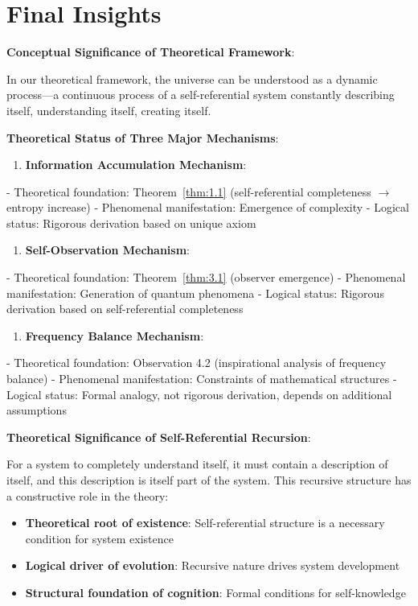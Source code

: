 \section{Final Insights}
\label{sec:ch06_conclusion:final-insights}

\textbf{Conceptual Significance of Theoretical Framework}:

In our theoretical framework, the universe can be understood as a dynamic process---a continuous process of a self-referential system constantly describing itself, understanding itself, creating itself.

\textbf{Theoretical Status of Three Major Mechanisms}:

\begin{enumerate}
\item \textbf{Information Accumulation Mechanism}:
\end{enumerate}
   - Theoretical foundation: Theorem~\ref{thm:1.1} (self-referential completeness $\rightarrow$ entropy increase)
   - Phenomenal manifestation: Emergence of complexity
   - Logical status: Rigorous derivation based on unique axiom

\begin{enumerate}
\item \textbf{Self-Observation Mechanism}:
\end{enumerate}
   - Theoretical foundation: Theorem~\ref{thm:3.1} (observer emergence)
   - Phenomenal manifestation: Generation of quantum phenomena
   - Logical status: Rigorous derivation based on self-referential completeness

\begin{enumerate}
\item \textbf{Frequency Balance Mechanism}:
\end{enumerate}
   - Theoretical foundation: Observation 4.2 (inspirational analysis of frequency balance)
   - Phenomenal manifestation: Constraints of mathematical structures
   - Logical status: Formal analogy, not rigorous derivation, depends on additional assumptions

\textbf{Theoretical Significance of Self-Referential Recursion}:

For a system to completely understand itself, it must contain a description of itself, and this description is itself part of the system. This recursive structure has a constructive role in the theory:

\begin{itemize}
\item \textbf{Theoretical root of existence}: Self-referential structure is a necessary condition for system existence
\item \textbf{Logical driver of evolution}: Recursive nature drives system development
\item \textbf{Structural foundation of cognition}: Formal conditions for self-knowledge
\end{itemize}

